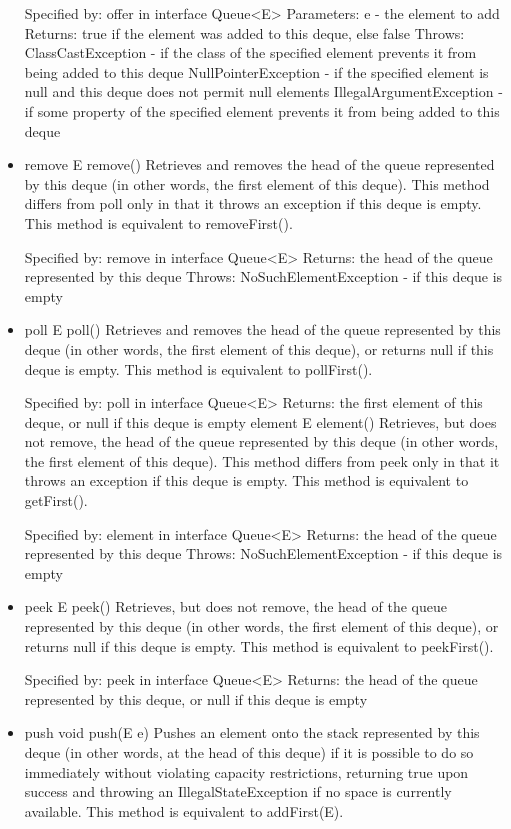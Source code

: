 \documentclass{book}
\begin{document}
\begin{itemize}
	Specified by:
	offer in interface Queue<E>
	Parameters:
	e - the element to add
	Returns:
	true if the element was added to this deque, else false
	Throws:
	ClassCastException - if the class of the specified element prevents it from being added to this deque
	NullPointerException - if the specified element is null and this deque does not permit null elements
	IllegalArgumentException - if some property of the specified element prevents it from being added to this deque
	
	\item remove
	E remove()
	Retrieves and removes the head of the queue represented by this deque (in other words, the first element of this deque). This method differs from poll only in that it throws an exception if this deque is empty.
	This method is equivalent to removeFirst().
	
	Specified by:
	remove in interface Queue<E>
	Returns:
	the head of the queue represented by this deque
	Throws:
	NoSuchElementException - if this deque is empty
	
	\item poll
	E poll()
	Retrieves and removes the head of the queue represented by this deque (in other words, the first element of this deque), or returns null if this deque is empty.
	This method is equivalent to pollFirst().
	
	Specified by:
	poll in interface Queue<E>
	Returns:
	the first element of this deque, or null if this deque is empty
	element
	E element()
	Retrieves, but does not remove, the head of the queue represented by this deque (in other words, the first element of this deque). This method differs from peek only in that it throws an exception if this deque is empty.
	This method is equivalent to getFirst().
	
	Specified by:
	element in interface Queue<E>
	Returns:
	the head of the queue represented by this deque
	Throws:
	NoSuchElementException - if this deque is empty
	
	\item peek
	E peek()
	Retrieves, but does not remove, the head of the queue represented by this deque (in other words, the first element of this deque), or returns null if this deque is empty.
	This method is equivalent to peekFirst().
	
	Specified by:
	peek in interface Queue<E>
	Returns:
	the head of the queue represented by this deque, or null if this deque is empty
	
	\item push
	void push(E e)
	Pushes an element onto the stack represented by this deque (in other words, at the head of this deque) if it is possible to do so immediately without violating capacity restrictions, returning true upon success and throwing an IllegalStateException if no space is currently available.
	This method is equivalent to addFirst(E).
	

\end{itemize}
\end{document}
